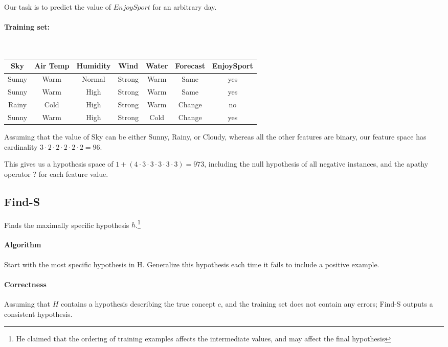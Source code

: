 \documentclass{idc_msc}
\begin{document}
Our task is to predict the value of $EnjoySport$ for an arbitrary day.

\paragraph{Training set:}\ \\

\begin{tabu} to \linewidth {ccccccc}
  Sky & Air Temp & Humidity & Wind & Water & Forecast & EnjoySport \\
  \hline
  Sunny & Warm & Normal & Strong & Warm & Same & yes \\
  Sunny & Warm & High & Strong & Warm & Same & yes \\
  Rainy & Cold & High & Strong & Warm & Change & no \\
  Sunny & Warm & High & Strong & Cold & Change & yes \\
  \hline
\end{tabu}

Assuming that the value of Sky can be either Sunny, Rainy, or Cloudy, whereas all the other features are binary, our feature space has cardinality $3\cdot2\cdot2\cdot2\cdot2\cdot2=96$.

This gives us a hypothesis space of $1 + (4 \cdot 3 \cdot 3 \cdot 3 \cdot 3 \cdot 3) = 973$, including the null hypothesis of all negative instances, and the apathy operator ? for each feature value.

\subsection{Find-S}

Finds the maximally specific hypothesis $h$.\footnote{He claimed that the ordering of training examples affects the intermediate values, and may affect the final hypothesis}

\paragraph{Algorithm}

Start with the most specific hypothesis in H.
Generalize this hypothesis each time it fails to include a positive example.

\paragraph{Correctness}

Assuming that $H$ contains a hypothesis describing the true concept $c$, and the training set does not contain any errors;
Find-S outputs a consistent hypothesis.
\end{document}
